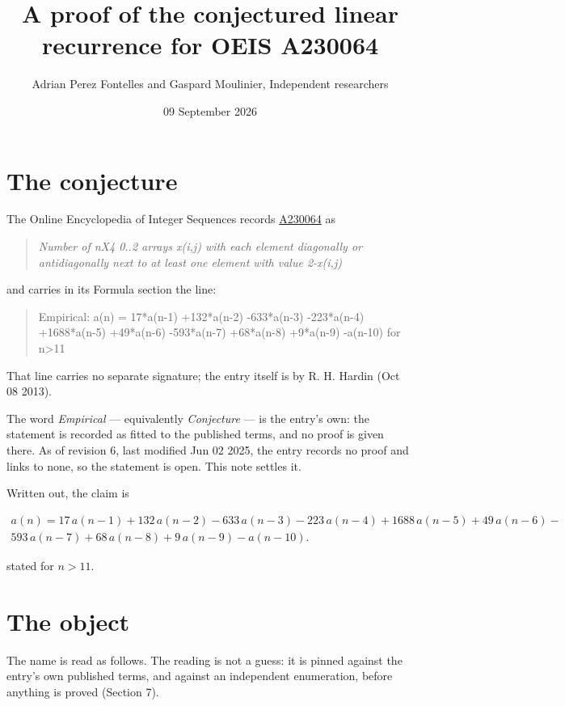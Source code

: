 \documentclass[11pt]{article}
\title{A proof of the conjectured linear recurrence for OEIS A230064}
\author{Adrian Perez Fontelles and Gaspard Moulinier, Independent researchers}
\date{09 September 2026}
\theoremstyle{definition}
\begin{document}
\maketitle
\section{The conjecture}

The Online Encyclopedia of Integer Sequences records \href{https://oeis.org/A230064}{A230064} as

\begin{quote}\itshape Number of nX4 0..2 arrays x(i,j) with each element diagonally or antidiagonally next to at least one element with value 2-x(i,j)\end{quote}

and carries in its Formula section the line:

\begin{quote}\ttfamily Empirical: a(n) = 17*a(n-1) +132*a(n-2) -633*a(n-3) -223*a(n-4) +1688*a(n-5) +49*a(n-6) -593*a(n-7) +68*a(n-8) +9*a(n-9) -a(n-10) for n>11\end{quote}

That line carries no separate signature; the entry itself is by R. H. Hardin (Oct 08 2013).

The word {\itshape Empirical} --- equivalently {\itshape Conjecture} --- is the entry's own: the statement is recorded as fitted to the published terms, and no proof is given there. As of revision 6, last modified Jun 02 2025, the entry records no proof and links to none, so the statement is open. This note settles it.

Written out, the claim is

\begin{multline*} a(n) = 17\,a(n-1) + 132\,a(n-2) - 633\,a(n-3) - 223\,a(n-4) + 1688\,a(n-5) + 49\,a(n-6) - \\ 593\,a(n-7) + 68\,a(n-8) + 9\,a(n-9) - a(n-10). \end{multline*}

stated for $n > 11$.

\section{The object}

The name is read as follows. The reading is not a guess: it is pinned against the entry's own published terms, and against an independent enumeration, before anything is proved (Section 7).
\end{document}

